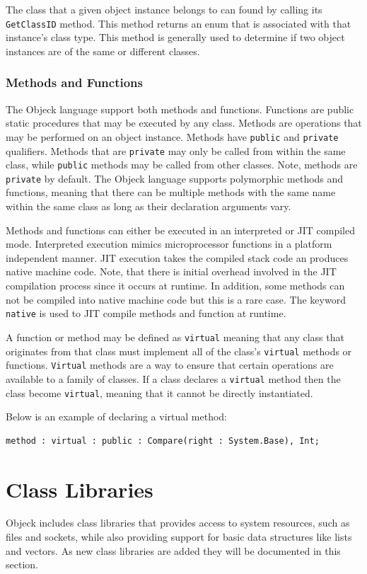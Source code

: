\documentclass[12pt]{article}
\begin{document}
The class that a given object instance belongs to can found by calling its \texttt{GetClassID} method.  This method returns an enum that is associated with that instance's class type.  This method is generally used to determine if two object instances are of the same or different classes.

\subsubsection{Methods and Functions}
The Objeck language support both methods and functions.  Functions are public static procedures that may be executed by any class.  Methods are operations that may be performed on an object instance.  Methods have \texttt{public} and \texttt{private} qualifiers.  Methods that are \texttt{private} may only be called from within the same class, while \texttt{public} methods may be called from other classes.  Note, methods are \texttt{private} by default. The Objeck language supports polymorphic methods and functions, meaning that there can be multiple methods with the same name within the same class as long as their declaration arguments vary.

Methods and functions can either be executed in an interpreted or JIT compiled mode. Interpreted execution mimics microprocessor functions in a platform independent manner. JIT execution takes the compiled stack code an produces native machine code. Note, that there is initial overhead involved in the JIT compilation process since it occurs at runtime. In addition, some methods can not be compiled into native machine code but this is a rare case.  The keyword \texttt{native} is used to JIT compile methods and function at runtime.

A function or method may be defined as \texttt{virtual} meaning that any class that originates from that class must implement all of the class's \texttt{virtual} methods or functions.  \texttt{Virtual} methods are a way to ensure that certain operations are available to a family of classes. If a class declares a \texttt{virtual} method then the class become \texttt{virtual}, meaning that it cannot be directly instantiated.

Below is an example of declaring a virtual method:
\begin{verbatim}
method : virtual : public : Compare(right : System.Base), Int;
\end{verbatim}

\section{Class Libraries}
Objeck includes class libraries that provides access to system resources, such as files and sockets, while also providing support for  basic data structures like lists and vectors.  As new class libraries are added they will be documented in this section.
\end{document}
